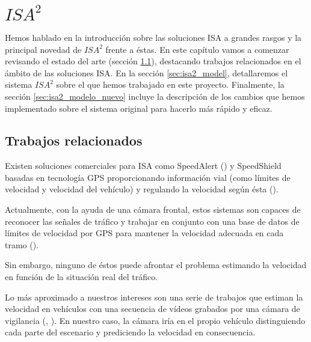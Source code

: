 \chapter{$ISA^{2}$}
\label{ch:stego}

Hemos hablado en la introducción sobre las soluciones \ac{ISA} a grandes rasgos y la principal novedad de $ISA^{2}$ frente a éstas. En este capítulo vamos a comenzar revisando el estado del arte (sección \ref{sec:isa2_estado_del_arte}), destacando trabajos relacionados en el ámbito de las soluciones \ac{ISA}. En la sección \ref{sec:isa2_model}, detallaremos el sistema $ISA^{2}$ sobre el que hemos trabajado en este proyecto. Finalmente, la sección \ref{sec:isa2_modelo_nuevo} incluye la descripción de los cambios que hemos implementado sobre el sistema original para hacerlo más rápido y eficaz.


\section{Trabajos relacionados}
\label{sec:isa2_estado_del_arte}

Existen soluciones comerciales para \ac{ISA} como SpeedAlert (\cite{soluciones_comerciales}) y SpeedShield basadas en tecnología \ac{GPS} proporcionando información vial (como límites de velocidad y velocidad del vehículo) y regulando la velocidad según ésta (\cite{speedshield}).

Actualmente, con la ayuda de una cámara frontal, estos sistemas son capaces de reconocer las señales de tráfico y trabajar en conjunto con una base de datos de límites de velocidad por \ac{GPS} para mantener la velocidad adecuada en cada tramo (\cite{sol_img}).

Sin embargo, ninguno de éstos puede afrontar el problema estimando la velocidad en función de la situación real del tráfico.

Lo más aproximado a nuestros intereses son una serie de trabajos que estiman la velocidad en vehículos con una secuencia de vídeos grabados por una cámara de vigilancia (\cite{isa2}, \cite{shukla}). En nuestro caso, la cámara iría en el propio vehículo distinguiendo cada parte del escenario y prediciendo la velocidad en consecuencia.


